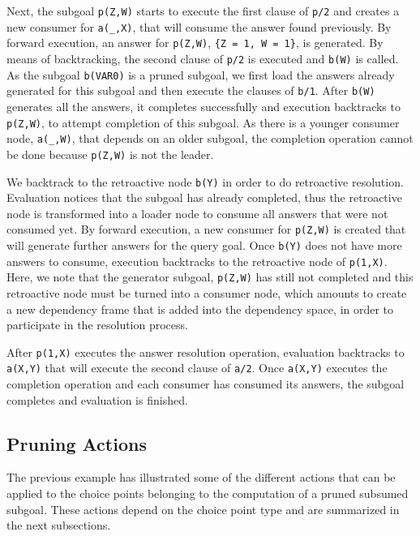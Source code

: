 Next, the subgoal \texttt{p(Z,W)} starts to execute the first clause of \texttt{p/2} and creates
a new consumer for \texttt{a(\_,X)}, that will consume the answer found previously. By forward execution, an answer
for \texttt{p(Z,W)}, \texttt{\{Z~=~1,~W~=~1\}}, is generated. By means of backtracking, the second
clause of \texttt{p/2} is executed and \texttt{b(W)} is called. As the subgoal \texttt{b(VAR0)} is a pruned subgoal,
we first load the answers already generated for this subgoal and then execute the clauses of \texttt{b/1}.
After \texttt{b(W)} generates all the answers, it completes successfully and execution backtracks to
\texttt{p(Z,W)}, to attempt completion of this subgoal. As there is a younger consumer node, \texttt{a(\_,W)},
that depends on an older subgoal, the completion operation cannot be done because \texttt{p(Z,W)} is not the leader.

We backtrack to the retroactive node \texttt{b(Y)} in order to do retroactive resolution. Evaluation
notices that the subgoal has already completed, thus the retroactive node is transformed into a loader node
to consume all answers that were not consumed yet. By forward execution, a new consumer for \texttt{p(Z,W)} is
created that will generate further answers for the query goal. Once \texttt{b(Y)} does not have more answers
to consume, execution backtracks to the retroactive node of \texttt{p(1,X)}. Here, we note that
the generator subgoal, \texttt{p(Z,W)} has still not completed and this retroactive node must be turned
into a consumer node, which amounts to create a new dependency frame that is added into the dependency space,
in order to participate in the resolution process.

After \texttt{p(1,X)} executes the answer resolution
operation, evaluation backtracks to \texttt{a(X,Y)} that will execute the second clause of \texttt{a/2}.
Once \texttt{a(X,Y)} executes the completion operation and each consumer has consumed its answers,
the subgoal completes and evaluation is finished.

\subsection{Pruning Actions}

The previous example has illustrated some of the different actions that can be applied to the choice points
belonging to the computation of a pruned subsumed subgoal. These actions depend on the choice point
type and are summarized in the next subsections.

